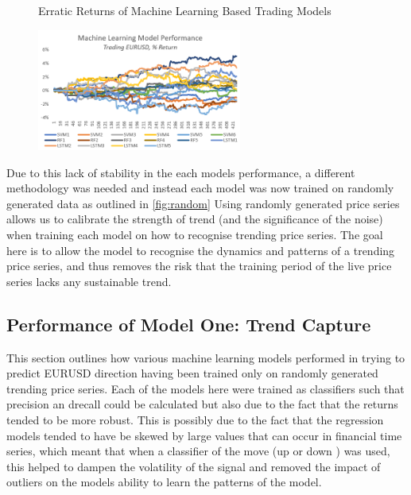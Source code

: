 \documentclass[11pt]{article}
\begin{document}
\begin{figure}[h]
    \centering
	\caption{Erratic Returns of Machine Learning Based Trading Models}    
	\includegraphics[width=0.6\textwidth]{ModelPerformance}
    \label{fig:model_perf}
     \caption*{}
\end{figure}
 Due to this lack of stability in the each models performance, a different methodology was needed and instead each model was now trained on randomly generated data as outlined in \ref{fig:random} Using randomly generated price series allows us to calibrate the strength of trend (and the significance of the noise) when training each model on how to recognise trending price series. The goal here is to allow the model to recognise the dynamics and patterns of a trending price series, and thus removes the risk that the training period of the live price series lacks any sustainable trend. 

\subsection{Performance of Model One: Trend Capture} \label{model1}

This section outlines how various machine learning models performed in trying to predict EURUSD direction having been trained only on randomly generated trending price series. Each of the models here were trained as classifiers such that precision an drecall could be calculated but also due to the fact that the returns tended to be more robust. This is possibly due to the fact that the regression models tended to have be skewed by large values that can occur in financial time series, which meant that when a classifier of the move (up or down ) was used, this helped to dampen the volatility of the signal and removed the impact of outliers on the models ability to learn the patterns of the model.
\end{document}
